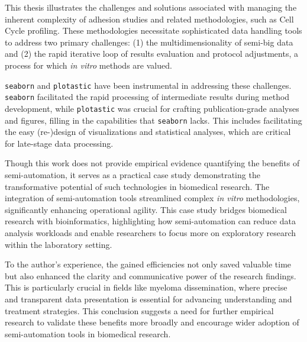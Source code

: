 



%
\label{sec:discussion_conclusion_semi_automation}%
This thesis illustrates the challenges and solutions associated with managing
the inherent complexity of adhesion studies and related methodologies, such as
Cell Cycle profiling. These methodologies necessitate sophisticated data
handling tools to address two primary challenges: (1) the multidimensionality of
semi-big data and (2) the rapid iterative loop of results evaluation and protocol
adjustments, a process for which \textit{in vitro} methods are valued.

\texttt{seaborn} and \texttt{plotastic} have been instrumental in addressing
these challenges. \texttt{seaborn} facilitated the rapid processing of
intermediate results during method development, while \texttt{plotastic} was
crucial for crafting publication-grade analyses and figures, filling in the
capabilities that \texttt{seaborn} lacks. This includes facilitating the easy
(re-)design of visualizations and statistical analyses, which are critical for
late-stage data processing.

Though this work does not provide empirical evidence quantifying the benefits of
semi-automation, it serves as a practical case study demonstrating the
transformative potential of such technologies in biomedical research. The
integration of semi-automation tools streamlined complex \textit{in vitro}
methodologies, significantly enhancing operational agility. This case study
bridges biomedical research with bioinformatics, highlighting how
semi-automation can reduce data analysis workloads and enable researchers to
focus more on exploratory research within the laboratory setting.

To the author's experience, the gained efficiencies not only saved valuable time
but also enhanced the clarity and communicative power of the research findings.
This is particularly crucial in fields like myeloma dissemination, where precise
and transparent data presentation is essential for advancing understanding and
treatment strategies. This conclusion suggests a need for further empirical
research to validate these benefits more broadly and encourage wider adoption of
semi-automation tools in biomedical research.

